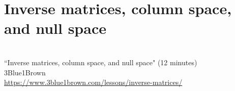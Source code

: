 \section{Inverse matrices, column space, and null space}
\begin{bookfigure}
   \\
  ``Inverse matrices, column space, and null space" (12 minutes) \\
  \footnotesize 3Blue1Brown \\
  \url{https://www.3blue1brown.com/lessons/inverse-matrices/}
\end{bookfigure}

